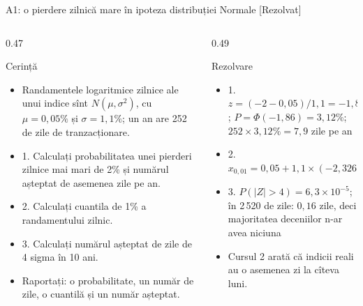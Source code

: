 \begin{frame}{A1: o pierdere zilnică mare în ipoteza distribuției Normale [Rezolvat]}
\itemsize{\footnotesize}
\begin{columns}[T]
\begin{column}{0.47\textwidth}
\begin{block}{Cerință}
\begin{itemize}
    \item Randamentele logaritmice zilnice ale unui indice sînt $N(\mu, \sigma^2)$, cu $\mu = 0{,}05\%$ și $\sigma = 1{,}1\%$; un an are 252 de zile de tranzacționare.
    \item 1. Calculați probabilitatea unei pierderi zilnice mai mari de 2\% și numărul așteptat de asemenea zile pe an.
    \item 2. Calculați cuantila de 1\% a randamentului zilnic.
    \item 3. Calculați numărul așteptat de zile de 4 sigma în 10 ani.
    \item Raportați: o probabilitate, un număr de zile, o cuantilă și un număr așteptat.
\end{itemize}
\end{block}
\end{column}
\begin{column}{0.49\textwidth}
\begin{exampleblock}{Rezolvare}
\begin{itemize}
    \item 1. $z = (-2 - 0{,}05)/1{,}1 = -1{,}86$; $P = \Phi(-1{,}86) = 3{,}12\%$; $252 \times 3{,}12\% = 7{,}9$ zile pe an
    \item 2. $x_{0{,}01} = 0{,}05 + 1{,}1 \times (-2{,}326) = -2{,}51\%$
    \item 3. $P(|Z| > 4) = 6{,}3 \times 10^{-5}$; în 2\,520 de zile: $0{,}16$ zile, deci majoritatea deceniilor n-ar avea niciuna
    \item Cursul 2 arată că indicii reali au o asemenea zi la cîteva luni.
\end{itemize}
\end{exampleblock}
\end{column}
\end{columns}
\end{frame}

